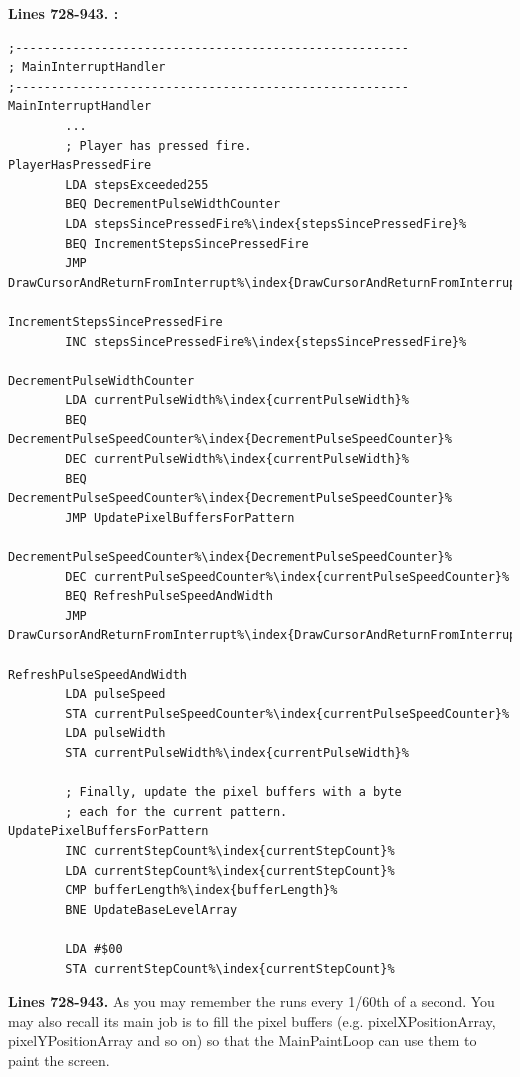 \clearpage

\clearpage
\textbf{Lines 728-943. :} 
\begin{lstlisting}[caption=From \icode{MainInterruptHandler}.,escapechar=\%]
;-------------------------------------------------------
; MainInterruptHandler
;-------------------------------------------------------
MainInterruptHandler
        ...
        ; Player has pressed fire.
PlayerHasPressedFire   
        LDA stepsExceeded255
        BEQ DecrementPulseWidthCounter
        LDA stepsSincePressedFire%\index{stepsSincePressedFire}%
        BEQ IncrementStepsSincePressedFire
        JMP DrawCursorAndReturnFromInterrupt%\index{DrawCursorAndReturnFromInterrupt}%

IncrementStepsSincePressedFire   
        INC stepsSincePressedFire%\index{stepsSincePressedFire}%

DecrementPulseWidthCounter   
        LDA currentPulseWidth%\index{currentPulseWidth}%
        BEQ DecrementPulseSpeedCounter%\index{DecrementPulseSpeedCounter}%
        DEC currentPulseWidth%\index{currentPulseWidth}%
        BEQ DecrementPulseSpeedCounter%\index{DecrementPulseSpeedCounter}%
        JMP UpdatePixelBuffersForPattern

DecrementPulseSpeedCounter%\index{DecrementPulseSpeedCounter}%   
        DEC currentPulseSpeedCounter%\index{currentPulseSpeedCounter}%
        BEQ RefreshPulseSpeedAndWidth
        JMP DrawCursorAndReturnFromInterrupt%\index{DrawCursorAndReturnFromInterrupt}%

RefreshPulseSpeedAndWidth   
        LDA pulseSpeed
        STA currentPulseSpeedCounter%\index{currentPulseSpeedCounter}%
        LDA pulseWidth
        STA currentPulseWidth%\index{currentPulseWidth}%

        ; Finally, update the pixel buffers with a byte
        ; each for the current pattern.        
UpdatePixelBuffersForPattern    
        INC currentStepCount%\index{currentStepCount}%
        LDA currentStepCount%\index{currentStepCount}%
        CMP bufferLength%\index{bufferLength}%
        BNE UpdateBaseLevelArray

        LDA #$00
        STA currentStepCount%\index{currentStepCount}%
\end{lstlisting}
\clearpage

\textbf{Lines 728-943. } 
As you may remember the  runs every 1/60th of a
second.  You may also recall its main job is to fill the pixel buffers (e.g.
pixelXPositionArray, pixelYPositionArray and so on) so that the MainPaintLoop
can use them to paint the screen. 

